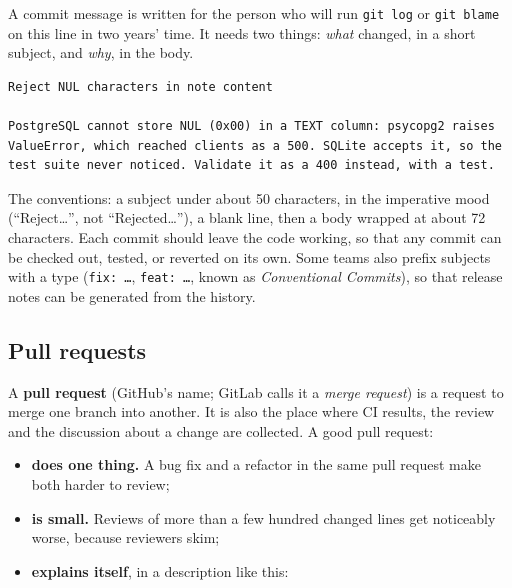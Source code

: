A commit message is written for the person who will run \texttt{git\ log} or \texttt{git\ blame} on this line in two years' time. It needs two things: \emph{what} changed, in a short subject, and \emph{why}, in the body.

\begin{outputbox}[short]
\begin{Verbatim}[fontsize=\codesize, breaklines, breakanywhere, breaksymbolleft={\tiny\textcolor{muted}{$\hookrightarrow$}}]
Reject NUL characters in note content

PostgreSQL cannot store NUL (0x00) in a TEXT column: psycopg2 raises
ValueError, which reached clients as a 500. SQLite accepts it, so the
test suite never noticed. Validate it as a 400 instead, with a test.
\end{Verbatim}
\end{outputbox}

\noindent{}The conventions: a subject under about 50 characters, in the imperative mood (``Reject\ldots{}'', not ``Rejected\ldots{}''), a blank line, then a body wrapped at about 72 characters. Each commit should leave the code working, so that any commit can be checked out, tested, or reverted on its own. Some teams also prefix subjects with a type (\texttt{fix:\ …}, \texttt{feat:\ …}, known as \emph{Conventional Commits}), so that release notes can be generated from the history.

\subsection*{Pull requests}\label{17-build-process:pull-requests}

A \textbf{pull request} (GitHub's name; GitLab calls it a \emph{merge request}) is a request to merge one branch into another. It is also the place where CI results, the review and the discussion about a change are collected. A good pull request:

\begin{itemize}
\tightlist
\item
  \textbf{does one thing.} A bug fix and a refactor in the same pull request make both harder to review;
\item
  \textbf{is small.} Reviews of more than a few hundred changed lines get noticeably worse, because reviewers skim;
\item
  \textbf{explains itself}, in a description like this:
\end{itemize}

